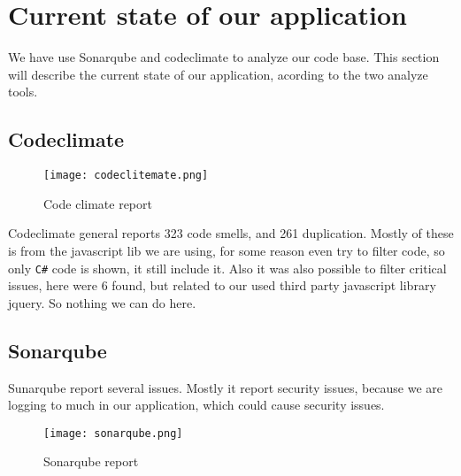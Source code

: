 \section{Current state of our application}

We have use Sonarqube and codeclimate to analyze our code base. This section will describe the current state of our application, acording to the two analyze tools. 

\subsection*{Codeclimate}

\begin{figure}[h]
	\centering
	\texttt{[image: codeclitemate.png]}
	\caption{Code climate report}
	\label{fig:Code climate}
\end{figure}

Codeclimate general reports 323 code smells, and 261 duplication. Mostly of these is from the javascript lib we are using, for some reason even try to filter code, so only \texttt{C\#} code is shown, it still include it. Also it was also possible to filter critical issues, here were 6 found, but related to our used third party javascript library jquery. So nothing we can do here. 

\subsection*{Sonarqube}
Sunarqube report several issues. Mostly it report security issues, because we are logging to much in our application, which could cause security issues. 
\begin{figure}[h]
	\centering
	\texttt{[image: sonarqube.png]}
	\caption{Sonarqube report}
	\label{fig:Sonarqube}
\end{figure}
